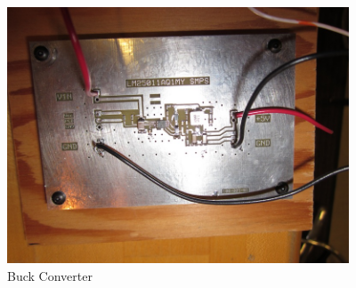 \begin{figure}[htbp]
\begin{center}
\includegraphics[width=4in]{includes/IMG_0263}
\caption{Buck Converter}
\end{center}
\end{figure}


